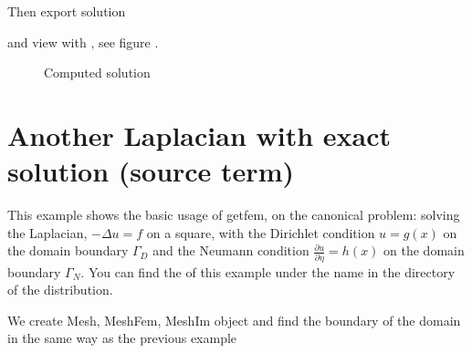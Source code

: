 \documentclass[a4paper,11pt,english]{sphinxmanual}
\begin{document}
\begin{sphinxVerbatim}[commandchars=\\\{\},numbers=left,firstnumber=1,stepnumber=1]

\end{sphinxVerbatim}

Then export solution

\begin{sphinxVerbatim}[commandchars=\\\{\},numbers=left,firstnumber=1,stepnumber=1]

\end{sphinxVerbatim}

and view with , see figure {\hyperref[\detokenize{python/examples:py-fig-sbs}]{}}.

\begin{figure}[htbp]
\centering
\capstart

\noindent{}
\caption{Computed solution}\label{\detokenize{python/examples:id1}}\label{\detokenize{python/examples:py-fig-sbs}}\end{figure}


\section{Another Laplacian with exact solution (source term)}
\label{\detokenize{python/examples:another-laplacian-with-exact-solution-source-term}}
This example shows the basic usage of getfem, on the canonical problem: solving
the Laplacian, \(-\Delta u = f\) on a square, with the Dirichlet condition
\(u = g(x)\) on the domain boundary \(\Gamma_D\) and the Neumann condition
\(\frac{\partial u}{\partial\eta} = h(x)\) on the domain boundary
\(\Gamma_N\). You can find the  of this example under the name
 in the directory  of the 
distribution.

We create Mesh, MeshFem, MeshIm object and find the boundary of the domain in
the same way as the previous example
\end{document}
